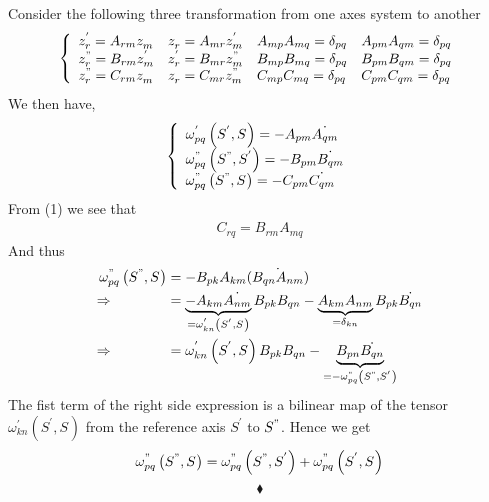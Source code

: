 Consider the following three transformation from one axes system to another 
\begin{align}
\left\{\begin{array}{llll}
z^{'}_r= A_{rm}z^{}_m&z^{}_r= A_{mr}z^{'}_m& A_{mp} A_{mq}=\delta_{pq}&A_{pm} A_{qm}=\delta_{pq}\\
z^{"}_r= B_{rm}z^{'}_m&z^{'}_r=B_{mr}z^{"}_m& B_{mp} B_{mq}=\delta_{pq}&B_{pm} B_{qm}=\delta_{pq}\\
z^{"}_r= C_{rm}z^{}_m&z^{}_r=C_{mr}z^{"}_m& C_{mp} C_{mq}=\delta_{pq}&C_{pm} C_{qm}=\delta_{pq}
\end{array}\right.
\end{align}
We then have,
\begin{align}
\left\{\begin{array}{l}
\omega^{'}_{pq}\left(S^{'},S^{}\right)= -A_{pm}\dot{A_{qm}}\\
\omega^{"}_{pq}\left(S^{"},S^{'}\right)= -B_{pm}\dot{B_{qm}}\\
\omega^{"}_{pq}\left(S^{"},S^{}\right)= -C_{pm}\dot{C_{qm}}
\end{array}\right.
 \end{align}
 From (1) we see that 
 \begin{align}
 C_{rq}= B_{rm}A_{mq}
 \end{align}
 And thus 
 \begin{align}
 \omega^{"}_{pq}\left(S^{"},S^{}\right)&= -B_{pk}A_{km}\dot{\left(B_{qn}A_{nm}\right)}\\
\Rightarrow\quad\quad\quad\quad &= \underbrace{-A_{km}\dot{A_{nm}}}_{= \omega^{'}_{kn}\left(S^{'},S^{}\right)}B_{pk}B_{qn}-\underbrace{A_{km}A_{nm}}_{=\delta_{kn}}B_{pk}\dot{B_{qn}}\\
\Rightarrow\quad\quad\quad\quad &=  \omega^{'}_{kn}\left(S^{'},S^{}\right)B_{pk}B_{qn}-\underbrace{B_{pn}\dot{B_{qn}}}_{=-\omega^{"}_{pq}\left(S^{"},S^{'}\right)}
 \end{align}
 The fist term of the right side expression is a bilinear map of the tensor $\omega^{'}_{kn}\left(S^{'},S^{}\right)$ from the reference axis $S^{'}$ to $S^{"}$. Hence we get 
\begin{align}
\omega^{"}_{pq}\left(S^{"},S^{}\right)=\omega^{"}_{pq}\left(S^{"},S^{'}\right)+\omega^{"}_{pq}\left(S^{'},S^{}\right)
\end{align}
$$\blacklozenge$$

\newpage
